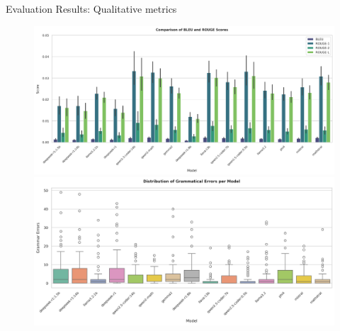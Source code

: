 \documentclass{beamer}
\begin{document}
\begin{frame}{Evaluation Results: Qualitative metrics}
  \begin{figure}
    \centering
    \begin{minipage}{0.45\textwidth}
      \centering
      \includegraphics[width=\textwidth]{bleu_rouge.png}
    \end{minipage}
    \hfill
    \begin{minipage}{0.45\textwidth}
      \centering
      \includegraphics[width=\textwidth]{grammar_errors.png}
    \end{minipage}
    
    \vspace{0.15cm}
    

\end{figure}
\end{frame}
\end{document}
